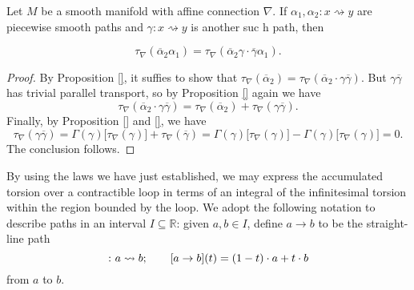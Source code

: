 \begin{proposition}
  Let $M$ be a smooth manifold with affine connection $\nabla$. If $\alpha_1, \alpha_2 \colon x \rightsquigarrow y$ are piecewise smooth paths and $\gamma \colon x \rightsquigarrow y$ is another suc\kern0pt h path, then

  \begin{equation}
    \tau_\nabla(\overline{\alpha}_2 \alpha_1) = \tau_\nabla( \overline{\alpha}_2 \gamma \cdot \overline{\gamma}\alpha_1).
  \end{equation}
\end{proposition}

\begin{proof}
  By Proposition \ref{}, it suffies to show that $\tau_\nabla(\overline{\alpha}_2) = \tau_\nabla(\overline{\alpha}_2 \cdot \gamma \overline{\gamma})$. But $\gamma \overline{\gamma}$ has trivial parallel transport, so by Proposition \ref{} again we have
  \begin{equation}
    \tau_\nabla( \overline{\alpha}_2 \cdot \gamma \overline{\gamma}) = \tau_\nabla( \overline{\alpha}_2) + \tau_\nabla(\gamma \overline{\gamma}).
  \end{equation}
  Finally, by Proposition \ref{} and \ref{}, we have
  \begin{equation*}
    \tau_\nabla(\gamma \overline{\gamma}) = \Gamma(\gamma)\big[\tau_\nabla(\gamma)\big] + \tau_\nabla(\overline{\gamma}) = \Gamma(\gamma)\big[\tau_\nabla(\gamma)\big] - \Gamma(\gamma)\big[\tau_\nabla(\gamma)\big] = 0.
  \end{equation*}
  The conclusion follows.
\end{proof}

\newpage

By using the laws we have just established, we may express the accumulated torsion over a contractible loop in terms of an integral of the infinitesimal torsion within the region bounded by the loop. We adopt the following notation to describe paths in an interval $I \subseteq \mathbb{R}$: given $a, b \in I$, define $a \to b$ to be the straight-line path
\begin{equation}
  [a \to b] \colon a \rightsquigarrow b; \quad \quad [\hspace{-0.25pt}a \to b](t) = (1-t) \cdot a + t \cdot b
\end{equation} 
from $a$ to $b$. 


